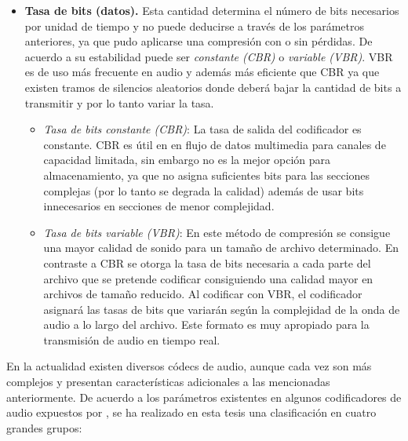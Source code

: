 \begin{itemize}
	\item\textbf{Tasa de bits (datos).} Esta cantidad determina el número de bits necesarios por unidad de tiempo y no puede deducirse a través de los parámetros anteriores, ya que pudo aplicarse una compresión con o sin pérdidas. De acuerdo a su estabilidad puede ser \emph{constante (CBR)} o \emph{variable (VBR)}. VBR es de uso más frecuente en audio y además más eficiente que CBR ya que existen tramos de silencios aleatorios donde deberá bajar la cantidad de bits a transmitir y por lo tanto variar la tasa. 
		\begin{itemize}
		\item\emph{Tasa de bits constante (CBR)}: La tasa de salida del codificador es constante. CBR es útil en en flujo de datos multimedia para canales de capacidad limitada, sin embargo no es la mejor opción para almacenamiento, ya que no asigna suficientes bits para las secciones complejas (por lo tanto se degrada la calidad) además de usar bits innecesarios en secciones de menor complejidad.
		\item\emph{Tasa de bits variable (VBR)}: En este método de compresión se consigue una mayor calidad de sonido para un tamaño de archivo determinado. En contraste a CBR se otorga la tasa de bits necesaria a cada parte del archivo que se pretende codificar consiguiendo una calidad mayor en archivos de tamaño reducido. Al codificar con VBR, el codificador asignará las tasas de bits que variarán según la complejidad de la onda de audio a lo largo del archivo. Este formato es muy apropiado para la transmisión de audio en tiempo real.
		\end{itemize}
\end{itemize}
En la actualidad existen diversos códecs de audio, aunque cada vez son más complejos y presentan características adicionales a las mencionadas anteriormente. De acuerdo a los parámetros existentes en algunos codificadores de audio expuestos por \cite{Bosi2003}, se ha realizado en esta tesis una clasificación en cuatro grandes grupos:
